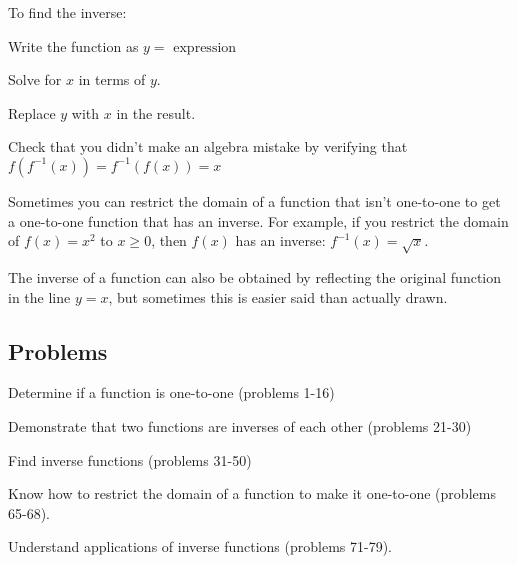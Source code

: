 \documentclass{article}
\begin{document}
To find the inverse:
\begin{itemize*}
  \item Write the function as $y = \text{ expression }$
  \item Solve for $x$ in terms of $y$.
  \item Replace $y$ with $x$ in the result.
  \item Check that you didn't make an algebra mistake by verifying that $f(f^{-1}(x)) = f^{-1}(f(x)) = x$
\end{itemize*}

Sometimes you can restrict the domain of a function that isn't one-to-one to get a one-to-one function that has an
inverse.  For example, if you restrict the domain of $f(x) = x^2$ to $x \geq 0$, then $f(x)$ has an inverse: 
$f^{-1}(x) = \sqrt{x}$.

The inverse of a function can also be obtained by reflecting the original function in the line $y = x$, but sometimes
this is easier said than actually drawn.

\subsection{Problems}

\begin{itemize*}
  \item Determine if a function is one-to-one (problems 1-16)

  \item Demonstrate that two functions are inverses of each other (problems 21-30)

  \item Find inverse functions (problems 31-50)

  \item Know how to restrict the domain of a function to make it one-to-one (problems 65-68).

  \item Understand applications of inverse functions (problems 71-79).
\end{itemize*}
\end{document}
